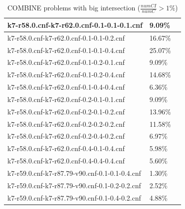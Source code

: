 \documentclass[12pt,a4paper,twoside]{scrartcl}
\numberwithin{equation}{section}
\begin{document}
\begin{table}[H]
\begin{center}
\begin{tabular}{|l|l|p{1cm}|}
k7-r58.0.cnf-k7-r62.0.cnf-0.1-0.1-0.1.cnf&	9.09\%\\  \hline
k7-r58.0.cnf-k7-r62.0.cnf-0.1-0.1-0.2.cnf&	16.67\%\\  \hline
k7-r58.0.cnf-k7-r62.0.cnf-0.1-0.1-0.4.cnf&	25.07\%\\  \hline
k7-r58.0.cnf-k7-r62.0.cnf-0.1-0.2-0.1.cnf&	9.09\%\\  \hline
k7-r58.0.cnf-k7-r62.0.cnf-0.1-0.2-0.4.cnf&	14.68\%\\  \hline
k7-r58.0.cnf-k7-r62.0.cnf-0.1-0.4-0.4.cnf&	6.36\%\\  \hline
k7-r58.0.cnf-k7-r62.0.cnf-0.2-0.1-0.1.cnf&	9.09\%\\  \hline
k7-r58.0.cnf-k7-r62.0.cnf-0.2-0.1-0.2.cnf&	13.96\%\\  \hline
k7-r58.0.cnf-k7-r62.0.cnf-0.2-0.2-0.2.cnf&	11.58\%\\  \hline
k7-r58.0.cnf-k7-r62.0.cnf-0.2-0.4-0.2.cnf&	6.97\%\\  \hline
k7-r58.0.cnf-k7-r62.0.cnf-0.4-0.1-0.4.cnf&	5.98\%\\  \hline
k7-r58.0.cnf-k7-r62.0.cnf-0.4-0.4-0.4.cnf&	5.60\%\\  \hline
k7-r59.0.cnf-k7-r87.79-v90.cnf-0.1-0.1-0.4.cnf&	1.30\%\\  \hline
k7-r59.0.cnf-k7-r87.79-v90.cnf-0.1-0.2-0.2.cnf&	2.52\%\\  \hline
k7-r59.0.cnf-k7-r87.79-v90.cnf-0.1-0.4-0.2.cnf&	4.88\%\\  \hline
\end{tabular}
 \caption[Caption for LOF]{COMBINE problems with big intersection ($\frac{numCI}{numC} > 1\%$)\footnotemark}
\end{center}
\end{table} 
\end{document}
